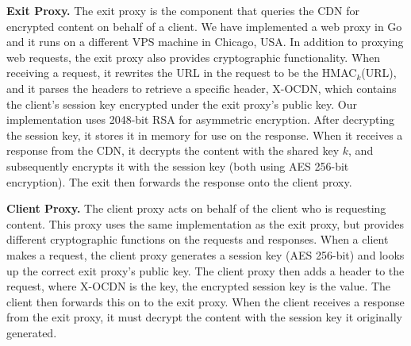 {\bf Exit Proxy.} The exit proxy is the component that queries the CDN for encrypted 
content on behalf of a client.  We have implemented a web proxy in Go and it runs on 
a different VPS machine in Chicago, USA.  In addition to proxying web requests, the exit 
proxy also provides cryptographic functionality.  When receiving a request, it rewrites
the URL in the request to be the HMAC$_{k}$(URL), and it parses the headers to retrieve a 
specific header, X-OCDN, which contains the client's session key encrypted under the exit 
proxy's public key.  Our implementation uses 2048-bit RSA for asymmetric encryption.  After 
decrypting the session key, it stores it in memory for use on the response.  When 
it receives a response from the CDN, it decrypts the content with the shared key $k$, and 
subsequently encrypts it with the session key (both using AES 256-bit encryption).  The 
exit then forwards the response onto the client proxy.

{\bf Client Proxy.} The client proxy acts on behalf of the client who is requesting 
content.  This proxy uses the same implementation as the exit proxy, but provides 
different cryptographic functions on the requests and responses.  When a client makes 
a request, the client proxy generates a session key  (AES 256-bit) and looks up the correct exit proxy's 
public key.  The client proxy then adds a header to the request, 
where X-OCDN is the key, the encrypted session key is the value.  The client then forwards this on to the 
exit proxy.  When the client receives a response from the exit proxy, it must decrypt the content 
with the session key it originally generated.   
